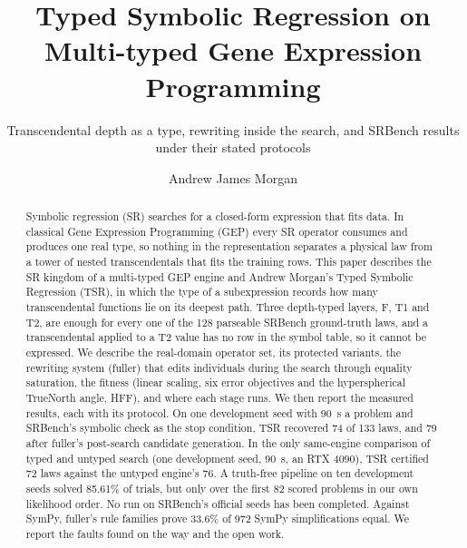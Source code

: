 \documentclass[sigconf,nonacm]{acmart}
\newcommand{\ty}[1]{\textsf{#1}}
\begin{document}
\title{Typed Symbolic Regression on Multi-typed Gene Expression Programming}
\subtitle{Transcendental depth as a type, rewriting inside the search, and
SRBench results under their stated protocols}

\author{Andrew James Morgan}
\renewcommand{\shortauthors}{Morgan}

\begin{abstract}
Symbolic regression (SR) searches for a closed-form expression that fits data.
In classical Gene Expression Programming (GEP) every SR operator consumes and
produces one real type, so nothing in the representation separates a physical
law from a tower of nested transcendentals that fits the training rows. This
paper describes the SR kingdom of a multi-typed GEP engine and Andrew Morgan's
Typed Symbolic Regression (TSR), in which the type of a subexpression records
how many transcendental functions lie on its deepest path. Three depth-typed
layers, \ty{F}, \ty{T1} and \ty{T2}, are enough for every one of the 128
parseable SRBench ground-truth laws, and a transcendental applied to a \ty{T2}
value has no row in the symbol table, so it cannot be expressed. We describe the
real-domain operator set, its protected variants, the rewriting system (fuller)
that edits individuals during the search through equality saturation, the
fitness (linear scaling, six error objectives and the hyperspherical TrueNorth
angle, HFF), and where each stage runs. We then report the measured results,
each with its protocol. On one development seed with 90~s a problem and
SRBench's symbolic check as the stop condition, TSR recovered 74 of 133 laws,
and 79 after fuller's post-search candidate generation. In the only
same-engine comparison of typed and untyped search (one development seed,
90~s, an RTX 4090), TSR certified 72 laws against the untyped engine's 76. A
truth-free pipeline on ten development seeds solved 85.61\% of trials, but only
over the first 82 scored problems in our own likelihood order. No run on
SRBench's official seeds has been completed. Against SymPy, fuller's rule
families prove 33.6\% of 972 SymPy simplifications equal. We report the faults
found on the way and the open work.
\end{abstract}

\maketitle
\end{document}
